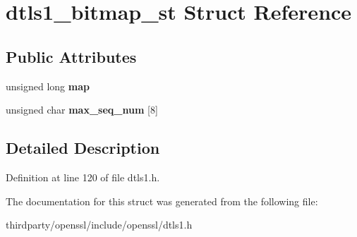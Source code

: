 \hypertarget{structdtls1__bitmap__st}{}\section{dtls1\+\_\+bitmap\+\_\+st Struct Reference}
\label{structdtls1__bitmap__st}
\subsection*{Public Attributes}
\begin{DoxyCompactItemize}
\item 
\mbox{\label{structdtls1__bitmap__st_a1b23acab32785f0a6780921565166622}} 
unsigned long {\bfseries map}
\item 
\mbox{\label{structdtls1__bitmap__st_aab16a8e227150f8bb745ea006b798221}} 
unsigned char {\bfseries max\+\_\+seq\+\_\+num} \mbox{[}8\mbox{]}
\end{DoxyCompactItemize}


\subsection{Detailed Description}


Definition at line 120 of file dtls1.\+h.



The documentation for this struct was generated from the following file\+:\begin{DoxyCompactItemize}
\item 
thirdparty/openssl/include/openssl/dtls1.\+h\end{DoxyCompactItemize}
